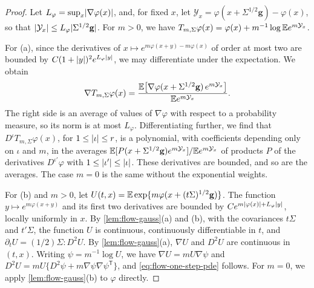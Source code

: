 \begin{proof}
Let $L_\varphi=\sup_x\lvert \nabla\varphi(x)\rvert$, and, for fixed $x$, let
$\mathcal Y_x=\varphi(x+\Sigma^{1/2}\mathbf g)-\varphi(x)$, so that $\lvert \mathcal Y_x\rvert\le L_\varphi\lvert \Sigma^{1/2}\mathbf g\rvert$.
For $m>0$, we have
$T_{m,\Sigma}\varphi(x)=\varphi(x)+m^{-1}\log\mathbb E e^{m\mathcal Y_x}$.

For (a), since the derivatives of $x\mapsto e^{m\varphi(x+y)-m\varphi(x)}$ of
order at most two are bounded by $C(1+\lvert y\rvert)^2e^{L_\varphi\lvert y\rvert}$, we may differentiate
under the expectation. We obtain
\begin{equation}\label{eq:flow-tilted-gradient}
 \nabla T_{m,\Sigma}\varphi(x)
 =\frac{\mathbb E\bigl[\nabla\varphi(x+\Sigma^{1/2}\mathbf g)\,e^{m\mathcal Y_x}\bigr]}{\mathbb E e^{m\mathcal Y_x}}.
\end{equation}
The right side is an average of values of $\nabla\varphi$ with respect to a
probability measure, so its norm is at most $L_\varphi$.
Differentiating further, we find that $D^\iota T_{m,\Sigma}\varphi(x)$, for
$1\le\lvert \iota\rvert\le r$, is a polynomial, with coefficients depending only on $\iota$
and $m$, in the averages
$\mathbb E[P(x+\Sigma^{1/2}\mathbf g)e^{m\mathcal Y_x}]/\mathbb E e^{m\mathcal Y_x}$ of products $P$ of the derivatives
$D^{\iota'}\varphi$ with $1\le\lvert \iota'\rvert\le\lvert \iota\rvert$. These derivatives are
bounded, and so are the averages. The case $m=0$ is the same without the
exponential weights.

For (b) and $m>0$, let $U(t,x)=\mathbb E\exp\{m\varphi(x+(t\Sigma)^{1/2}\mathbf g)\}$. The
function $y\mapsto e^{m\varphi(x+y)}$ and its first two derivatives are bounded
by $Ce^{m\lvert \varphi(x)\rvert+L_\varphi\lvert y\rvert}$, locally uniformly in $x$. By
\cref{lem:flow-gauss}(a) and (b), with the covariances $t\Sigma$ and
$t'\Sigma$, the function $U$ is continuous, continuously differentiable in $t$,
and $\partial_tU=(1/2)\Sigma\mathbin{:}D^2U$. By \cref{lem:flow-gauss}(a),
$\nabla U$ and $D^2U$ are continuous in $(t,x)$. Writing $\psi=m^{-1}\log U$, we
have $\nabla U=mU\nabla\psi$ and $D^2U=mU\{D^2\psi+m\nabla\psi\nabla\psi^{\mathsf T}\}$,
and \eqref{eq:flow-one-step-pde} follows. For $m=0$, we apply
\cref{lem:flow-gauss}(b) to $\varphi$ directly.


\end{proof}
